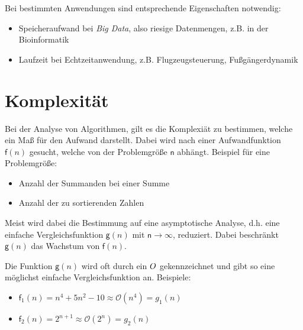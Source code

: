 \documentclass[
  letterpaper,
  DIV=11,
  numbers=noendperiod]{scrreprt}
\providecommand{\tightlist}{%
  \setlength{\itemsep}{0pt}\setlength{\parskip}{0pt}}\usepackage{longtable,booktabs,array}
\begin{document}
Bei bestimmten Anwendungen sind entsprechende Eigenschaften notwendig:

\begin{itemize}
\tightlist
\item
  Speicheraufwand bei \emph{Big Data}, also riesige Datenmengen, z.B. in
  der Bioinformatik
\item
  Laufzeit bei Echtzeitanwendung, z.B. Flugzeugsteuerung,
  Fußgängerdynamik
\end{itemize}

\section{Komplexität}\label{komplexituxe4t}

Bei der Analyse von Algorithmen, gilt es die Komplexiät zu bestimmen,
welche ein Maß für den Aufwand darstellt. Dabei wird nach einer
Aufwandfunktion \(\mathsf f(n)\) gesucht, welche von der Problemgröße
\(\mathsf n\) abhängt. Beispiel für eine Problemgröße:

\begin{itemize}
\tightlist
\item
  Anzahl der Summanden bei einer Summe
\item
  Anzahl der zu sortierenden Zahlen
\end{itemize}

Meist wird dabei die Bestimmung auf eine asymptotische Analyse, d.h.
eine einfache Vergleichsfunktion \(\mathsf g(n)\) mit
\(\mathsf n \rightarrow \infty\), reduziert. Dabei beschränkt
\(\mathsf g(n)\) das Wachstum von \(\mathsf f(n)\).

Die Funktion \(\mathsf g(n)\) wird oft durch ein \(\mathsf \mathcal{O}\)
gekennzeichnet und gibt so eine möglichst einfache Vergleichsfunktion
an. Beispiele:

\begin{itemize}
\tightlist
\item
  \(\mathsf f_1(n) = n^4 + 5n^2 - 10 \approx \mathcal{O}(n^4) = g_1(n)\)
\item
  \(\mathsf f_2(n) = 2^{n+1} \approx \mathcal{O}(2^n) = g_2(n)\)
\end{itemize}
\end{document}

